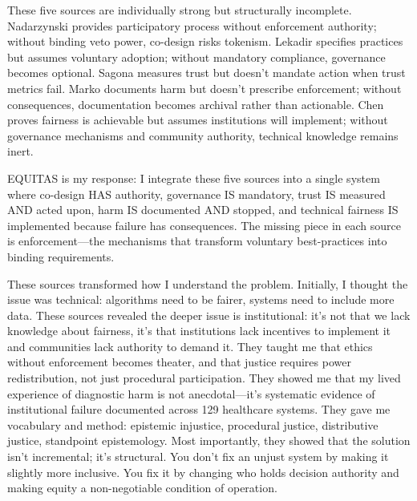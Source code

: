 \documentclass[12pt,a4paper]{article}
\begin{document}
These five sources are individually strong but structurally incomplete. Nadarzynski provides participatory process without enforcement authority; without binding veto power, co-design risks tokenism. Lekadir specifies practices but assumes voluntary adoption; without mandatory compliance, governance becomes optional. Sagona measures trust but doesn't mandate action when trust metrics fail. Marko documents harm but doesn't prescribe enforcement; without consequences, documentation becomes archival rather than actionable. Chen proves fairness is achievable but assumes institutions will implement; without governance mechanisms and community authority, technical knowledge remains inert.

EQUITAS is my response: I integrate these five sources into a single system where co-design HAS authority, governance IS mandatory, trust IS measured AND acted upon, harm IS documented AND stopped, and technical fairness IS implemented because failure has consequences. The missing piece in each source is enforcement—the mechanisms that transform voluntary best-practices into binding requirements.

\begin{tcolorbox}[colback=questionbg,colframe=questionborder,title=\textbf{GUIDING QUESTION:} How have these articles informed your understanding of the ethical dimensions?]
\end{tcolorbox}

These sources transformed how I understand the problem. Initially, I thought the issue was technical: algorithms need to be fairer, systems need to include more data. These sources revealed the deeper issue is institutional: it's not that we lack knowledge about fairness, it's that institutions lack incentives to implement it and communities lack authority to demand it. They taught me that ethics without enforcement becomes theater, and that justice requires power redistribution, not just procedural participation. They showed me that my lived experience of diagnostic harm is not anecdotal—it's systematic evidence of institutional failure documented across 129 healthcare systems. They gave me vocabulary and method: epistemic injustice, procedural justice, distributive justice, standpoint epistemology. Most importantly, they showed that the solution isn't incremental; it's structural. You don't fix an unjust system by making it slightly more inclusive. You fix it by changing who holds decision authority and making equity a non-negotiable condition of operation.
\end{document}
